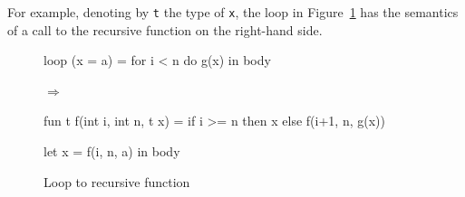 \documentclass{sigplanconf}  %
\begin{document}
For example, denoting by {\tt t} the type of {\tt x}, the loop in
Figure~\ref{fig:loop-recursion} has the semantics of a call to the
recursive function on the right-hand side.

\begin{figure}
\begin{minipage}{0.35\columnwidth}
\begin{colorcode}
loop (x = a) =
  for i < n do
    g(x)
in body
\end{colorcode}
\end{minipage}
\begin{minipage}{0.05\columnwidth}
$\Rightarrow$
\end{minipage}
\begin{minipage}{0.6\columnwidth}
\begin{colorcode}
fun t f(int i, int n, t x) =
  if i >= n then x
     else f(i+1, n, g(x))

let x = f(i, n, a)
in body
\end{colorcode}
\end{minipage}
\caption{Loop to recursive function}
\label{fig:loop-recursion}
\end{figure}
\end{document}
